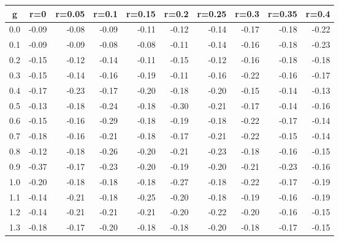 %
\begin{table}[!tbp]
 \begin{center}
 \begin{tabular}{rrrrrrrrrr}\hline\hline
\multicolumn{1}{c}{g}&\multicolumn{1}{c}{r=0}&\multicolumn{1}{c}{r=0.05}&\multicolumn{1}{c}{r=0.1}&\multicolumn{1}{c}{r=0.15}&\multicolumn{1}{c}{r=0.2}&\multicolumn{1}{c}{r=0.25}&\multicolumn{1}{c}{r=0.3}&\multicolumn{1}{c}{r=0.35}&\multicolumn{1}{c}{r=0.4}\tabularnewline
\hline
0.0&-0.09&-0.08&-0.09&-0.11&-0.12&-0.14&-0.17&-0.18&-0.22\tabularnewline
0.1&-0.09&-0.09&-0.08&-0.08&-0.11&-0.14&-0.16&-0.18&-0.23\tabularnewline
0.2&-0.15&-0.12&-0.14&-0.11&-0.15&-0.12&-0.16&-0.18&-0.18\tabularnewline
0.3&-0.15&-0.14&-0.16&-0.19&-0.11&-0.16&-0.22&-0.16&-0.17\tabularnewline
0.4&-0.17&-0.23&-0.17&-0.20&-0.18&-0.20&-0.15&-0.14&-0.13\tabularnewline
0.5&-0.13&-0.18&-0.24&-0.18&-0.30&-0.21&-0.17&-0.14&-0.16\tabularnewline
0.6&-0.15&-0.16&-0.29&-0.18&-0.19&-0.18&-0.22&-0.17&-0.14\tabularnewline
0.7&-0.18&-0.16&-0.21&-0.18&-0.17&-0.21&-0.22&-0.15&-0.14\tabularnewline
0.8&-0.12&-0.18&-0.26&-0.20&-0.21&-0.23&-0.18&-0.16&-0.15\tabularnewline
0.9&-0.37&-0.17&-0.23&-0.20&-0.19&-0.20&-0.21&-0.23&-0.16\tabularnewline
1.0&-0.20&-0.18&-0.18&-0.18&-0.27&-0.18&-0.22&-0.17&-0.19\tabularnewline
1.1&-0.14&-0.21&-0.18&-0.25&-0.20&-0.18&-0.19&-0.16&-0.19\tabularnewline
1.2&-0.14&-0.21&-0.21&-0.21&-0.20&-0.22&-0.20&-0.16&-0.15\tabularnewline
1.3&-0.18&-0.17&-0.20&-0.18&-0.18&-0.20&-0.18&-0.17&-0.15\tabularnewline
\hline
\end{tabular}

\end{center}

\end{table}

